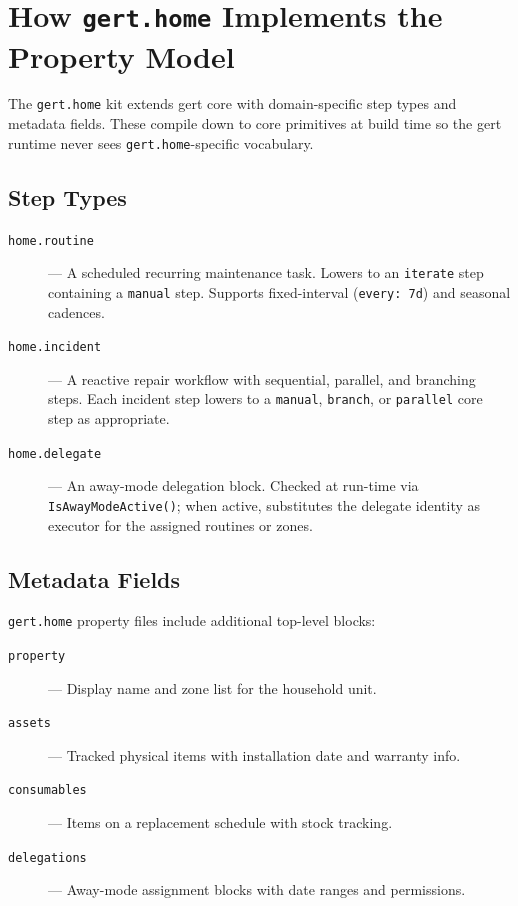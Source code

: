 \section{How \texttt{gert.home} Implements the Property Model}
\label{sec:intro-implementation}

The \texttt{gert.home} kit extends gert core with domain-specific step types and
metadata fields. These compile down to core primitives at build time so the gert runtime
never sees \texttt{gert.home}-specific vocabulary.

\subsection{Step Types}

\begin{description}
  \item[\texttt{home.routine}] --- A scheduled recurring maintenance task. Lowers to an
        \texttt{iterate} step containing a \texttt{manual} step. Supports fixed-interval
        (\texttt{every: 7d}) and seasonal cadences.
  \item[\texttt{home.incident}] --- A reactive repair workflow with sequential, parallel, and
        branching steps. Each incident step lowers to a \texttt{manual}, \texttt{branch}, or
        \texttt{parallel} core step as appropriate.
  \item[\texttt{home.delegate}] --- An away-mode delegation block. Checked at run-time via
        \texttt{IsAwayModeActive()}; when active, substitutes the delegate identity as executor
        for the assigned routines or zones.
\end{description}

\subsection{Metadata Fields}

\texttt{gert.home} property files include additional top-level blocks:

\begin{description}
  \item[\texttt{property}] --- Display name and zone list for the household unit.
  \item[\texttt{assets}] --- Tracked physical items with installation date and warranty info.
  \item[\texttt{consumables}] --- Items on a replacement schedule with stock tracking.
  \item[\texttt{delegations}] --- Away-mode assignment blocks with date ranges and permissions.
\end{description}

